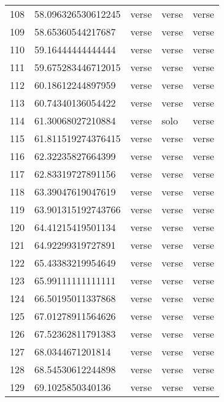 \begin{table}[]
\begin{tabular}{lllll}
    108  & 58.096326530612245 & verse        & verse           & verse          \\
    109  & 58.65360544217687  & verse        & verse           & verse          \\
    110  & 59.16444444444444  & verse        & verse           & verse          \\
    111  & 59.675283446712015 & verse        & verse           & verse          \\
    112  & 60.18612244897959  & verse        & verse           & verse          \\
    113  & 60.74340136054422  & verse        & verse           & verse          \\
    114  & 61.30068027210884  & verse        & solo            & verse          \\
    115  & 61.811519274376415 & verse        & verse           & verse          \\
    116  & 62.32235827664399  & verse        & verse           & verse          \\
    117  & 62.83319727891156  & verse        & verse           & verse          \\
    118  & 63.39047619047619  & verse        & verse           & verse          \\
    119  & 63.901315192743766 & verse        & verse           & verse          \\
    120  & 64.41215419501134  & verse        & verse           & verse          \\
    121  & 64.92299319727891  & verse        & verse           & verse          \\
    122  & 65.43383219954649  & verse        & verse           & verse          \\
    123  & 65.99111111111111  & verse        & verse           & verse          \\
    124  & 66.50195011337868  & verse        & verse           & verse          \\
    125  & 67.01278911564626  & verse        & verse           & verse          \\
    126  & 67.52362811791383  & verse        & verse           & verse          \\
    127  & 68.0344671201814   & verse        & verse           & verse          \\
    128  & 68.54530612244898  & verse        & verse           & verse          \\
    129  & 69.1025850340136   & verse        & verse           & verse          \\

\end{tabular}
\end{table}
